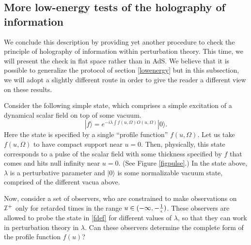 \documentclass[12pt]{article}
\newcommand{\be}{\begin{equation}}
\newcommand{\ee}{\end{equation}}
\def \scrip{{\cal I}^{+}}
\begin{document}
\subsection{More low-energy tests of the holography of information \label{morelowenergy}}
We conclude this description by providing yet another procedure to check the principle of holography of information within perturbation theory. This time, we will present the check in flat space rather than in AdS.  We believe that it is possible to generalize the protocol of section \ref{lowenergy} but in this subsection, we will adopt a slightly different route in order to give the reader a different view on these results.

Consider the following simple state, which comprises a simple excitation of a dynamical scalar field on top of some vacuum.
\be
\label{fdef}
|f \rangle = e^{-i \lambda \int f(u, \Omega) O(u, \Omega)} |0 \rangle.
\ee
Here the state is specified by a single ``profile function'' $f(u, \Omega)$. Let us take $f(u, \Omega)$ to have compact support near $u = 0$. Then, physically, this state corresponds to a pulse of the scalar field with some thickness specified by $f$ that comes and hits null infinity near $u = 0$. (See Figure \ref{figpulse}.) In the state above, $\lambda$ is a perturbative parameter and $|0 \rangle$ is some normalizable vacuum state, comprised of the different vacua above.

Now, consider a set of observers, who are constrained to make observations on $\scrip$ only for retarded times in the range $u \in (-\infty, -{1 \over \epsilon})$. These observers are allowed to probe the state in \eqref{fdef} for different values of $\lambda$, so that they can work in perturbation theory in $\lambda$. Can these observers determine the complete form of the profile function $f(u)$?
\end{document}
